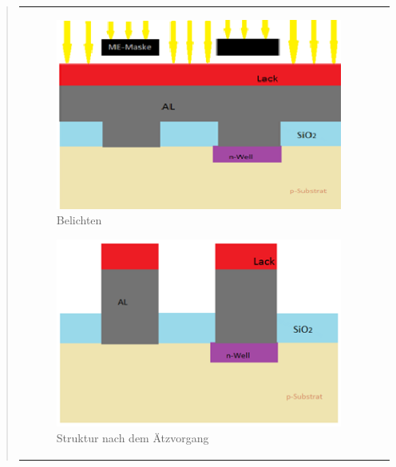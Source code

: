 \begin{quote}
\begin{center}
\begin{tabular}{ll}
                \hspace{-14em}
                    \begin{minipage}{0.8\textwidth}
                        \begin{figure}[H]
                        \hspace{6em}
                            \includegraphics[scale=0.9, trim = 0cm 0cm 0cm
                            0cm, clip]{./HerstellungBilder/BelichtendurchMEMaske.png}
                            \caption{Belichten}
                           \label{fig:belichten3}
                        \end{figure}

                    \end{minipage}
                    \begin{minipage}{0.5\textwidth}

                        \begin{figure}[H]
                        \hspace{-2em}
                            \includegraphics[scale=0.9, trim = 0cm 0cm 0cm
                            0cm, clip]
                            {./HerstellungBilder/StrukturnachdemAetzvorgang.png}
                            \caption{Struktur nach dem Ätzvorgang}
                           \label{fig:nachAetzen}
                        \end{figure}
                    \vspace{-1.5em}


\end{minipage}
\end{tabular}
\end{center}
\end{quote}

